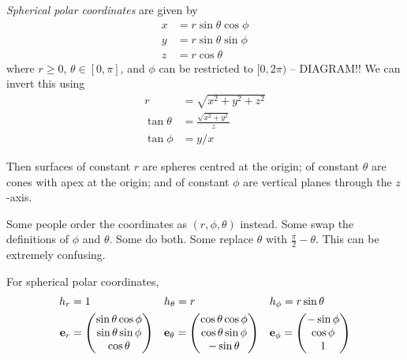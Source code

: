 \documentclass{../template/note}
\begin{document}
    \begin{definition*}
        \emph{Spherical polar coordinates} are given by
        \begin{align*}
            x &= r \sin \theta \cos \phi \\
            y &= r \sin \theta \sin \phi \\
            z &= r \cos \theta
        \end{align*}
        where \(r \geq 0\), \(\theta \in [0, \pi]\), and \(\phi\) can be restricted to \([0, 2\pi)\) -- DIAGRAM!! We can invert this using
        \begin{align*}
            r &= \sqrt{x^2+y^2+z^2} \\
            \tan \theta &= \frac{\sqrt{x^2+y^2}}{z} \\
            \tan \phi &= y/x
        \end{align*}
    \end{definition*}
    
    Then surfaces of constant \(r\) are spheres centred at the origin; of constant \(\theta\) are cones with apex at the origin; and of constant \(\phi\) are vertical planes through the \(z\)-axis.

    \begin{remark*}
        Some people order the coordinates as \((r, \phi, \theta)\) instead. Some swap the definitions of \(\phi\) and \(\theta\). Some do both. Some replace \(\theta\) with \(\frac{\pi}{2} - \theta\). This can be extremely confusing.
    \end{remark*}
    
    \begin{proposition}
        \label{3.4} For spherical polar coordinates, \begin{align*}
            h_r &= 1 && h_\theta = r && h_\phi = r \sin \theta \\
            \V e_r &= \begin{pmatrix}
             \sin \theta \cos \phi \\
             \sin \theta \sin \phi \\
             \cos \theta \\
            \end{pmatrix} && \V e_\theta = \begin{pmatrix}
             \cos \theta \cos \phi \\
             \cos \theta \sin \phi \\
             -\sin \theta \\
            \end{pmatrix} && \V e_\phi = \begin{pmatrix}
             -\sin \phi \\
             \cos \phi \\
             1 \\
            \end{pmatrix}
        \end{align*}
    \end{proposition}
\end{document}
